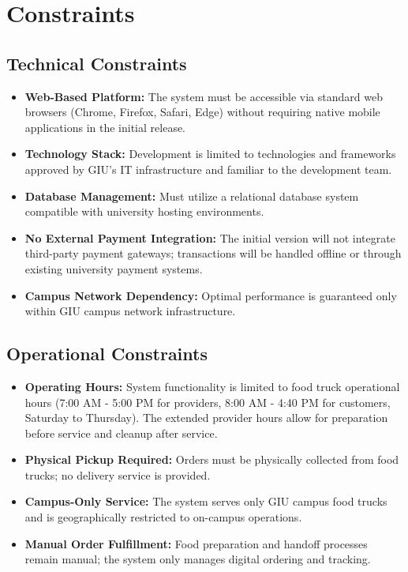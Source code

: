 \documentclass[12pt,a4paper]{article}
\begin{document}
\newpage

\section{Constraints}

\subsection{Technical Constraints}
\begin{itemize}[leftmargin=2em, itemsep=8pt]
    \item \textbf{Web-Based Platform:} The system must be accessible via standard web browsers (Chrome, Firefox, Safari, Edge) without requiring native mobile applications in the initial release.
    \item \textbf{Technology Stack:} Development is limited to technologies and frameworks approved by GIU's IT infrastructure and familiar to the development team.
    \item \textbf{Database Management:} Must utilize a relational database system compatible with university hosting environments.
    \item \textbf{No External Payment Integration:} The initial version will not integrate third-party payment gateways; transactions will be handled offline or through existing university payment systems.
    \item \textbf{Campus Network Dependency:} Optimal performance is guaranteed only within GIU campus network infrastructure.
\end{itemize}

\subsection{Operational Constraints}
\begin{itemize}[leftmargin=2em, itemsep=8pt]
    \item \textbf{Operating Hours:} System functionality is limited to food truck operational hours (7:00 AM - 5:00 PM for providers, 8:00 AM - 4:40 PM for customers, Saturday to Thursday). The extended provider hours allow for preparation before service and cleanup after service.
    \item \textbf{Physical Pickup Required:} Orders must be physically collected from food trucks; no delivery service is provided.
    \item \textbf{Campus-Only Service:} The system serves only GIU campus food trucks and is geographically restricted to on-campus operations.
    \item \textbf{Manual Order Fulfillment:} Food preparation and handoff processes remain manual; the system only manages digital ordering and tracking.
\end{itemize}
\end{document}

